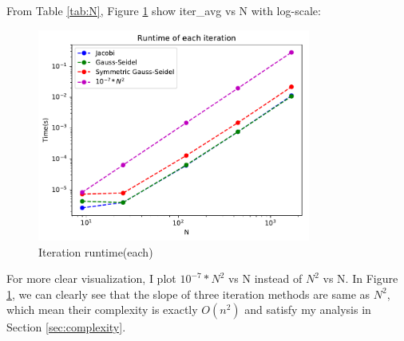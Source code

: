 \documentclass{article}
\begin{document}
From Table \ref{tab:N}, Figure \ref{fig:complexity} show iter\_avg vs N with log-scale:
\begin{figure}[H]
    \centering
    \includegraphics[width=0.8\textwidth]{src/complexity.pdf}
    \caption{Iteration runtime(each)}
    \label{fig:complexity}
\end{figure}
For more clear visualization, I plot $10^{-7} * N^2$ vs N instead of $N^2$ vs N. In Figure \ref{fig:complexity}, we can clearly see
that the slope of three iteration methods are same as $N^2$, which mean their complexity is exactly $O(n^2)$ and satisfy 
my analysis in Section \ref{sec:complexity}.
\end{document}
